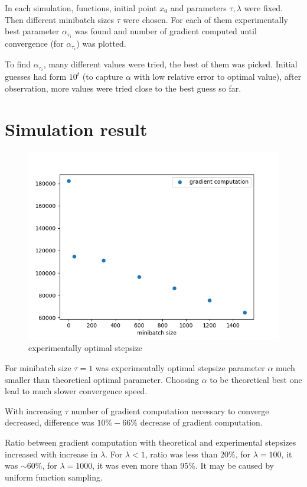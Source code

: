 \documentclass[11pt]{book}
\begin{document}
In each simulation, functions, initial point $x_0$ and parameters $\tau, \lambda$ were fixed. Then different minibatch sizes $\tau$ were chosen. For each of them experimentally best parameter $\alpha_{\tau_i}$ was found and number of gradient computed until convergence (for $\alpha_{\tau_i}$) was plotted. 

To find $\alpha_{\tau_i}$, many different values were tried, the best of them was picked. Initial guesses had form $10^t$ (to capture $\alpha$ with low relative error to optimal value), after observation, more values were tried close to the best guess so far.\\

\section{Simulation result}

\begin{figure}[H]
	\centering
	\includegraphics[width=.7\linewidth]{optimal_stepsize.png}
	\caption{experimentally optimal stepsize}
	\label{fig:optimal stepsize}
\end{figure}



For minibatch size $\tau=1$ was experimentally optimal stepsize parameter $\alpha$ much smaller than theoretical optimal parameter. Choosing $\alpha$ to be theoretical best one lead to much slower convergence speed.

With increasing $\tau$ number of gradient computation necessary to converge decreased, difference was $10\% - 66\%$ decrease of gradient computation.

Ratio between gradient computation with theoretical and experimental stepsizes increased with increase in $\lambda$. For $\lambda <1$, ratio was less than $20\%$, for $\lambda=100$, it was $\sim 60\%$, for $\lambda=1000$, it was even more than $95\%$. It may be caused by uniform function sampling.\\
\end{document}
